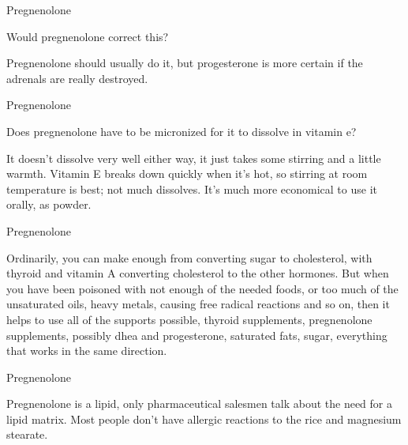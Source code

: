 \documentclass[11pt,oneside,openany,extrafontsizes]{memoir}
\begin{document}
\begin{qaexchange}{Pregnenolone}

    \begin{question}
        Would pregnenolone correct this?
    \end{question}

    \begin{answer}
        Pregnenolone should usually do it, but progesterone is more certain if the adrenals are really destroyed.
    \end{answer}
\end{qaexchange}

\begin{qaexchange}{Pregnenolone}

    \begin{question}
        Does pregnenolone have to be micronized for it to dissolve in vitamin e?
    \end{question}

    \begin{answer}
        It doesn't dissolve very well either way, it just takes some stirring and a little warmth. Vitamin E breaks down quickly when it's hot, so stirring at room temperature is best; not much dissolves. It's much more economical to use it orally, as powder.
    \end{answer}
\end{qaexchange}

\begin{standalonequote}{Pregnenolone}

    \begin{answer}
        Ordinarily, you can make enough from converting sugar to cholesterol, with thyroid and vitamin A converting cholesterol to the other hormones. But when you have been poisoned with not enough of the needed foods, or too much of the unsaturated oils, heavy metals, causing free radical reactions and so on, then it helps to use all of the supports possible, thyroid supplements, pregnenolone supplements, possibly dhea and progesterone, saturated fats, sugar, everything that works in the same direction.
    \end{answer}
\end{standalonequote}

\begin{standalonequote}{Pregnenolone}

    \begin{answer}
        Pregnenolone is a lipid, only pharmaceutical salesmen talk about the need for a lipid matrix. Most people don't have allergic reactions to the rice and magnesium stearate.
    \end{answer}
\end{standalonequote}
\end{document}
